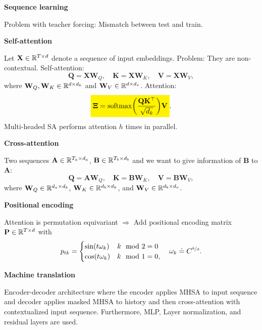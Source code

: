 \documentclass[10pt]{article}
\newenvironment{topic}[1]
{\textbf{\sffamily \footnotesize \colorbox{black}{\rlap{\textbf{\textcolor{white}{#1}}}\hspace{\linewidth}\hspace{-2\fboxsep}}}}
{}
\newenvironment{subtopic}[1]
{\begin{center}\textbf{\footnotesize \sffamily #1}\end{center}}
{}
\renewcommand{\mat}[1]{\ensuremath{\mathbf{#1}}}
\begin{document}
\begin{multicols*}{3}
\begin{topic}{Recurrent neural networks}
\begin{subtopic}{Sequence learning}
            Problem with teacher forcing: Mismatch between test and train.
        \end{subtopic}

    \end{topic}

    \begin{topic}{Transformers}

        \begin{subtopic}{Self-attention}
            Let $\mat{X} \in \R^{T \times d}$ denote a sequence of input embeddings. Problem: They are non-contextual. Self-attention: \[
                \mat{Q} = \mat{X} \mat{W}_Q, \quad \mat{K} = \mat{X} \mat{W}_K, \quad \mat{V} = \mat{X}\mat{W}_V,
            \]
            where $\mat{W}_Q, \mat{W}_K \in \R^{d\times d_k}$ and $\mat{W}_V \in \R^{d \times d_v}$. Attention: \[
                \colorbox{yellow}{$\displaystyle \mat{\Xi} = \mathrm{softmax} \lft( \frac{\mat{Q} \transpose{\mat{K}}}{\sqrt{d_k}} \rgt) \mat{V}$}.
            \]
            Multi-headed SA performs attention $h$ times in parallel.
        \end{subtopic}

        \begin{subtopic}{Cross-attention}
            Two sequences $\mat{A} \in \R^{T_a \times d_a}$, $\mat{B} \in \R^{T_b \times d_b}$ and we want to give information of $\mat{B}$ to $\mat{A}$: \[
                \mat{Q} = \mat{A}\mat{W}_Q, \quad \mat{K} = \mat{B} \mat{W}_K, \quad \mat{V} = \mat{B}\mat{W}_V,
            \]
            where $\mat{W}_Q \in \R^{d_a \times d_k}$, $\mat{W}_K \in \R^{d_b\times d_k}$, and $\mat{W}_V \in
                \R^{d_b \times d_v}$.

        \end{subtopic}

        \begin{subtopic}{Positional encoding}
            Attention is permutation equivariant $\Rightarrow$ Add positional encoding matrix $\mat{P} \in \R^{T \times d}$ with \[
                p_{tk} = \begin{cases}
                    \sin(t \omega_k) & k \mod 2 = 0  \\
                    \cos(t \omega_k) & k \mod 1 = 0,
                \end{cases}
                \quad \omega_k \doteq C^{\nicefrac{k}{d}}.
            \]
        \end{subtopic}

        \begin{subtopic}{Machine translation}
            Encoder-decoder architecture where the encoder applies MHSA to input sequence and decoder
            applies masked MHSA to history and then cross-attention with contextualized input
            sequence. Furthermore, MLP, Layer normalization, and residual layers are used.
        \end{subtopic}


\end{topic}
\end{multicols*}
\end{document}
